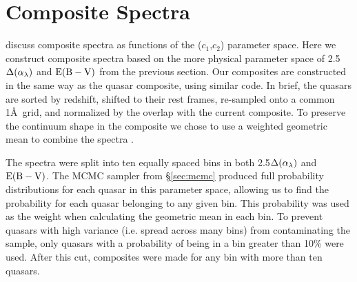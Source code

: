 



\section{Composite Spectra} \label{sec:spectra}

\citet{Hopkins:2004} discuss composite spectra as functions of the ($c_1$,$c_2$) parameter space.  Here we construct composite spectra based on the more physical parameter space of 2.5$\Delta(\alpha_{\lambda})$ and ${\rm E(B-V)}$ from the previous section.  Our composites are constructed in the same way as the \citet{Vanden-Berk:2001} quasar composite, using similar code. In brief, the quasars are sorted by redshift, shifted to their rest frames, re-sampled onto a common 1\AA\ grid, and normalized by the overlap with the current composite.  To preserve the continuum shape in the composite we chose to use a weighted geometric mean to combine the spectra \citep{Vanden-Berk:2001,Reichard:2003b}.

The spectra were split into ten equally spaced bins in both 2.5$\Delta(\alpha_{\lambda})$ and ${\rm E(B-V)}$. The MCMC sampler from \S\ref{sec:mcmc} produced full probability distributions for each quasar in this parameter space, allowing us to find the probability for each quasar belonging to any given bin.
This probability was used as the weight when calculating the geometric mean in each bin. To prevent quasars with high variance (i.e. spread across many bins) from contaminating the sample, only quasars with a probability of being in a bin greater than 10\% were used. After this cut, composites were made for any bin with more than ten quasars.


